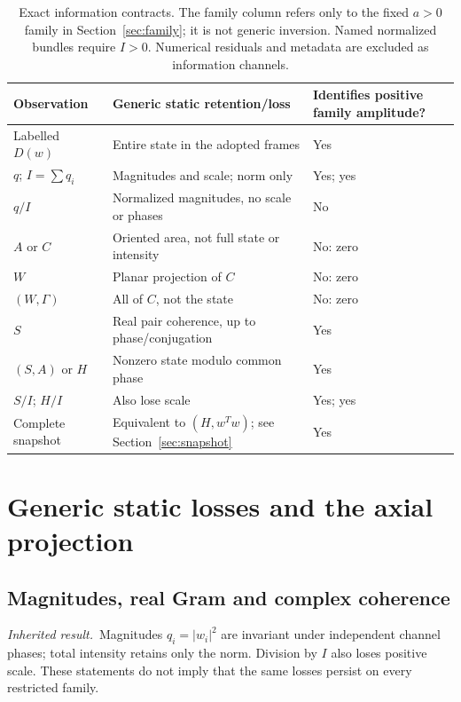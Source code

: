 \documentclass[11pt,a4paper]{article}
\newcommand{\inherited}{\textit{Inherited result.}}
\begin{document}
\begin{table}[htbp]\centering\small
\renewcommand{\arraystretch}{1.14}
\begin{tabular}{P{.22\linewidth}P{.47\linewidth}P{.21\linewidth}}\toprule
Observation & Generic static retention/loss & Identifies positive family amplitude?\\\midrule
Labelled $D(w)$ & Entire state in the adopted frames & Yes\\
$q$; $I=\sum q_i$ & Magnitudes and scale; norm only & Yes; yes\\
$q/I$ & Normalized magnitudes, no scale or phases & No\\
$A$ or $C$ & Oriented area, not full state or intensity & No: zero\\
$W$ & Planar projection of $C$ & No: zero\\
$(W,\Gamma)$ & All of $C$, not the state & No: zero\\
$S$ & Real pair coherence, up to phase/conjugation & Yes\\
$(S,A)$ or $H$ & Nonzero state modulo common phase & Yes\\
$S/I$; $H/I$ & Also lose scale & Yes; yes\\
Complete snapshot & Equivalent to $(H,w^Tw)$; see Section~\ref{sec:snapshot} & Yes\\\bottomrule
\end{tabular}
\caption{Exact information contracts. The family column refers only to the fixed $a>0$ family in Section~\ref{sec:family}; it is not generic inversion. Named normalized bundles require $I>0$. Numerical residuals and metadata are excluded as information channels.}
\label{tab:hierarchy}
\end{table}

\clearpage
\section{Generic static losses and the axial projection}\label{sec:generic}
\subsection{Magnitudes, real Gram and complex coherence}
\inherited\ Magnitudes $q_i=|w_i|^2$ are invariant under independent channel phases; total intensity retains only the norm. Division by $I$ also loses positive scale. These statements do not imply that the same losses persist on every restricted family.
\end{document}
